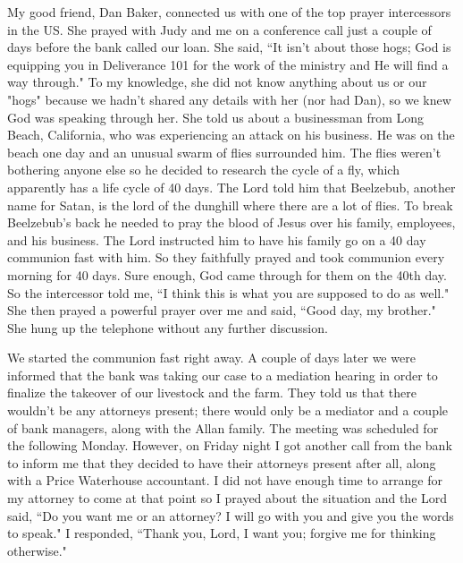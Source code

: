 \documentclass[oneside]{book}
\begin{document}
My good friend, Dan Baker, connected us with one of the top prayer intercessors in the US. She prayed with Judy and me on a conference call just a couple of days before the bank called our loan. She said, ``It isn't about those hogs; God is equipping you in Deliverance 101 for the work of the ministry and He will find a way through." To my knowledge, she did not know anything about us or our "hogs" because we hadn't shared any details with her (nor had Dan), so we knew God was speaking through her. She told us about a businessman from Long Beach, California, who was experiencing an attack on his business. He was on the beach one day and an unusual swarm of flies surrounded him. The flies weren't bothering anyone else so he decided to research the cycle of a fly, which apparently has a life cycle of 40 days. The Lord told him that Beelzebub, another name for Satan, is the lord of the dunghill where there are a lot of flies. To break Beelzebub's back he needed to pray the blood of Jesus over his family, employees, and his business. The Lord instructed him to have his family go on a 40 day communion fast with him. So they faithfully prayed and took communion every morning for 40 days. Sure enough, God came through for them on the 40th day. So the intercessor told me, ``I think this is what you are supposed to do as well." She then prayed a powerful prayer over me and said, ``Good day, my brother." She hung up the telephone without any further discussion.

We started the communion fast right away. A couple of days later we were informed that the bank was taking our case to a mediation hearing in order to finalize the takeover of our livestock and the farm. They told us that there wouldn't be any attorneys present; there would only be a mediator and a couple of bank managers, along with the Allan family. The meeting was scheduled for the following Monday. However, on Friday night I got another call from the bank to inform me that they decided to have their attorneys present after all, along with a Price Waterhouse accountant. I did not have enough time to arrange for my attorney to come at that point so I prayed about the situation and the Lord said, ``Do you want me or an attorney? I will go with you and give you the words to speak." I responded, ``Thank you, Lord, I want you; forgive me for thinking otherwise."
\end{document}
